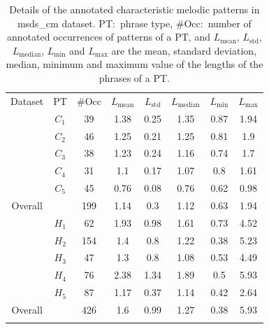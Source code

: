 {{{{\renewcommand{\arraystretch}{1.5}
	\begin{table} 
		\begin{centering}
			\begin{tabular}{ c c|c c c c c c}
				\tabletop
				Dataset	& PT 	&	\#Occ & $L_{\mathrm{mean}}$ & $L_{\mathrm{std}}$ &	$L_{\mathrm{median}}$ & $L_{\mathrm{min}}$ 	&	$L_{\mathrm{max}}$\\
				\tablemid
				\multirow{5}{*}{\acrshort{msds_cm_cmd}} 
				& $C_1$ & 39 & 1.38 & 0.25 & 1.35 & 0.87 & 1.94\\
				& $C_2$ & 46 & 1.25 & 0.21 & 1.25 & 0.81 & 1.9\\
				& $C_3$ & 38 & 1.23 & 0.24 & 1.16 & 0.74 & 1.7\\
				& $C_4$ & 31 & 1.1  & 0.17 & 1.07 & 0.8  & 1.61\\
				& $C_5$ & 45 & 0.76 & 0.08 & 0.76 & 0.62 & 0.98\\
				\tablemid
				Overall	&  	& 199& 1.14 & 0.3  & 1.12 & 0.63 & 1.94\\
				
				\tabletop		 
				\multirow{5}{*}{\acrshort{msds_cm_hmd}} 
				&  $H_1$& 62	&	1.93 & 0.98	&	1.61 &	0.73	&	4.52\TODO{WHY LESS??}\\
				& $H_2$ & 154 	& 	1.4  & 0.8 	& 	1.22 & 	0.38 	& 5.23 \\
				& $H_3$ & 47  	& 	1.3  & 0.8 	& 	1.08 & 	0.53 	& 4.49\\
				& $H_4$ & 76  	& 	2.38 & 1.34	& 	1.89 &	0.5  	& 5.93\\
				& $H_5$ & 87  	& 	1.17 & 0.37	& 	1.14 & 	0.42 	& 2.64\\
				
				\tablemid
				Overall	&  	& 426 & 1.6 & 0.99& 1.27 & 0.38 & 5.93\\
				
				\tablebot
			\end{tabular}
			\caption[Details of the annotated characteristic melodic patterns in \acrshort{msds_cm} dataset.]{Details of the annotated characteristic melodic patterns in \acrshort{msds_cm} dataset. PT:~phrase type, \#Occ:~number of annotated occurrences of  patterns of a PT, and $L_{\mathrm{mean}}$, $L_{\mathrm{std}}$, $L_{\mathrm{median}}$, $L_{\mathrm{min}}$ and $L_{\mathrm{max}}$ are the mean, standard deviation, median, minimum and maximum value of the lengths of the phrases of a PT.} 
			\label{tab:categorywise_details_revised_melodic_similarity_dataset}
			\par \end{centering}
	\end{table}
		
}}}}
